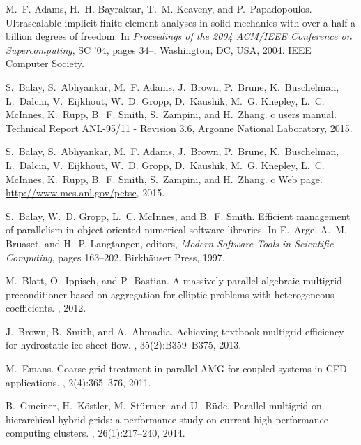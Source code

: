 \documentclass[]{siamart0216}
\begin{document}
\begin{thebibliography}{10}

M.~F. Adams, H.~H. Bayraktar, T.~M. Keaveny, and P.~Papadopoulos.
\newblock Ultrascalable implicit finite element analyses in solid mechanics
  with over a half a billion degrees of freedom.
\newblock In {\em Proceedings of the 2004 ACM/IEEE Conference on
  Supercomputing}, SC '04, pages 34--, Washington, DC, USA, 2004. IEEE Computer
  Society.

S.~Balay, S.~Abhyankar, M.~F. Adams, J.~Brown, P.~Brune, K.~Buschelman,
  L.~Dalcin, V.~Eijkhout, W.~D. Gropp, D.~Kaushik, M.~G. Knepley, L.~C.
  McInnes, K.~Rupp, B.~F. Smith, S.~Zampini, and H.~Zhang.
c users manual.
\newblock Technical Report ANL-95/11 - Revision 3.6, Argonne National
  Laboratory, 2015.

S.~Balay, S.~Abhyankar, M.~F. Adams, J.~Brown, P.~Brune, K.~Buschelman,
  L.~Dalcin, V.~Eijkhout, W.~D. Gropp, D.~Kaushik, M.~G. Knepley, L.~C.
  McInnes, K.~Rupp, B.~F. Smith, S.~Zampini, and H.~Zhang.
c {W}eb page.
\newblock \url{http://www.mcs.anl.gov/petsc}, 2015.

S.~Balay, W.~D. Gropp, L.~C. McInnes, and B.~F. Smith.
\newblock Efficient management of parallelism in object oriented numerical
  software libraries.
\newblock In E.~Arge, A.~M. Bruaset, and H.~P. Langtangen, editors, {\em Modern
  Software Tools in Scientific Computing}, pages 163--202. Birkh{\"{a}}user
  Press, 1997.

M.~Blatt, O.~Ippisch, and P.~Bastian.
\newblock A massively parallel algebraic multigrid preconditioner based on
  aggregation for elliptic problems with heterogeneous coefficients.
, 2012.

J.~Brown, B.~Smith, and A.~Ahmadia.
\newblock Achieving textbook multigrid efficiency for hydrostatic ice sheet
  flow.
, 35(2):B359--B375, 2013.

M.~Emans.
\newblock Coarse-grid treatment in parallel {AMG} for coupled systems in {CFD}
  applications.
, 2(4):365--376, 2011.

B.~Gmeiner, H.~K{\"o}stler, M.~St{\"u}rmer, and U.~R{\"u}de.
\newblock Parallel multigrid on hierarchical hybrid grids: a performance study
  on current high performance computing clusters.
,
  26(1):217--240, 2014.


\end{thebibliography}
\end{document}
